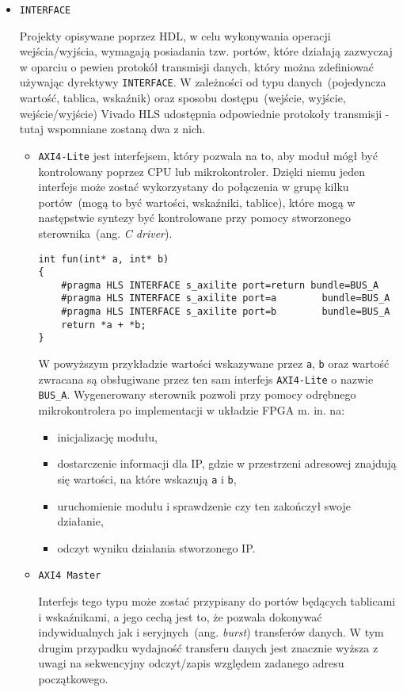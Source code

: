 \begin{itemize}
\item \texttt{INTERFACE}

Projekty opisywane poprzez HDL, w celu wykonywania operacji wejścia/wyjścia, wymagają posiadania tzw. portów, które działają zazwyczaj w oparciu o pewien protokół transmisji danych, który można zdefiniować używając dyrektywy \texttt{INTERFACE}. W zależności od typu danych~(pojedyncza wartość, tablica, wskaźnik) oraz sposobu dostępu~(wejście, wyjście, wejście/wyjście) Vivado HLS udostępnia odpowiednie protokoły transmisji - tutaj wspomniane zostaną dwa z nich.
\begin{itemize}
\item \texttt{AXI4-Lite} jest interfejsem, który pozwala na to, aby moduł mógł być kontrolowany poprzez CPU lub mikrokontroler. Dzięki niemu jeden interfejs może zostać wykorzystany do połączenia w grupę kilku portów~(mogą to być wartości, wskaźniki, tablice), które mogą w następstwie syntezy być kontrolowane przy pomocy stworzonego sterownika~(ang. \textit{C driver}). 
\begin{lstlisting}[caption=Przykład użycia interfejsu \texttt{AXI4-Lite}]
int fun(int* a, int* b)
{
	#pragma HLS INTERFACE s_axilite port=return bundle=BUS_A
	#pragma HLS INTERFACE s_axilite port=a 		  bundle=BUS_A
	#pragma HLS INTERFACE s_axilite port=b 		  bundle=BUS_A
	return *a + *b;
}
\end{lstlisting}
W powyższym przykładzie wartości wskazywane przez \texttt{a}, \texttt{b} oraz wartość zwracana są obsługiwane przez ten sam interfejs \texttt{AXI4-Lite} o nazwie \texttt{BUS\_A}. Wygenerowany sterownik pozwoli przy pomocy odrębnego mikrokontrolera po implementacji w układzie FPGA m. in. na:
\begin{itemize}
\item inicjalizację modułu,
\item dostarczenie informacji dla IP, gdzie w przestrzeni adresowej znajdują się wartości, na które wskazują \texttt{a} i \texttt{b},
\item uruchomienie modułu i sprawdzenie czy ten zakończył swoje działanie,
\item odczyt wyniku działania stworzonego IP.
\end{itemize}
\item \texttt{AXI4 Master}

Interfejs tego typu może zostać przypisany do portów będących tablicami i wskaźnikami, a jego cechą jest to, że pozwala dokonywać indywidualnych jak i seryjnych~(ang. \textit{burst}) transferów danych. W tym drugim przypadku wydajność transferu danych jest znacznie wyższa z uwagi na sekwencyjny odczyt/zapis względem zadanego adresu początkowego.


\end{itemize}
\end{itemize}

